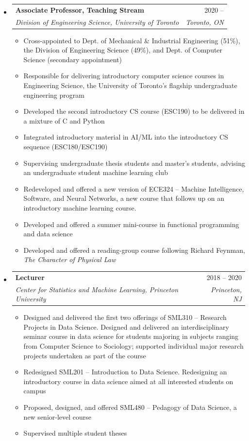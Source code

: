 \documentclass[letterpaper,11pt]{article}
\makeatletter
\newcommand{\ressubheading}[4]{
\begin{tabular*}{\linewidth}[t]{l@{\extracolsep{\fill}}r}
		\textbf{#1} & #2 \\
		\textit{\textcolor{accent}{#3}} & \textit{#4} \\
\end{tabular*}\vspace{-2pt}}
\makeatother
\begin{document}
\begin{itemize}

	
\item
	\ressubheading{Associate Professor, Teaching Stream}{2020 --  }{Division of Engineering Science, University of Toronto}{Toronto, ON}
\begin{itemize}
    \item Cross-appointed to Dept. of Mechanical \& Industrial Engineering (51\%), the Division of Engineering Science	(49\%), and Dept. of Computer Science (secondary appointment)
    \item Responsible for delivering introductory computer science courses in Engineering Science, the University of Toronto's flagship undergraduate engineering program
	\item Developed the second introductory CS course (ESC190) to be delivered in a mixture of C and Python
	\item Integrated introductory material in AI/ML into the introductory CS sequence (ESC180/ESC190)
	\item Supervising undergraduate thesis students and master's students, advising an undergraduate student machine learning club
	\item Redeveloped and offered a new version of ECE324 -- Machine Intelligence, Software, and Neural Networks, a new course that follows up on an introductory machine learning course.

	\item Developed and offered a summer mini-course in functional programming and data science
	\item Developed and offered a reading-group course following Richard Feynman, \textit{The Character of Physical Law}
\end{itemize}
	\item
	\ressubheading{Lecturer}{2018 -- 2020 }{Center for Statistics and Machine Learning, Princeton University}{Princeton, NJ}
	\begin{itemize}
		\item Designed and delivered the first two offerings of SML310 -- Research Projects in Data Science. Designed and delivered an interdisciplinary seminar course in data science for students majoring in subjects ranging from Computer Science to Sociology; supported individual major research projects undertaken as part of the course
		\item Redesigned SML201 -- Introduction to Data Science. Redesigning an introductory course in data science aimed at all interested students on campus
		\item Proposed, designed, and offered SML480 -- Pedagogy of Data Science, a new senior-level course
		\item Supervised multiple student theses
	\end{itemize}


\end{itemize}
\end{document}
